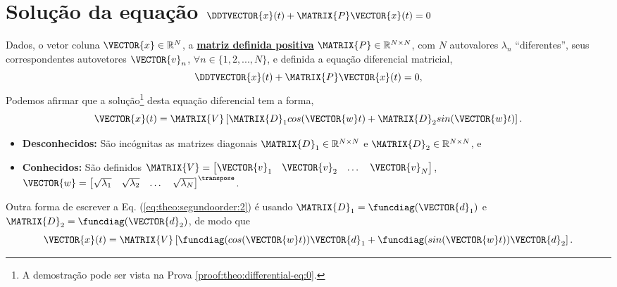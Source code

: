 \section{ Solução da equação $\DDTVECTOR{x}(t) + \MATRIX{P} \VECTOR{x}(t)=0$ }

\begin{theorem}[Equação 
$\DDTVECTOR{x}(t) + \MATRIX{P} \VECTOR{x}(t)=0$ com matriz $\MATRIX{P}$ definida positiva:]
\label{theo:differential-eq:0}
Dados, o vetor coluna $\VECTOR{x} \in \mathbb{R}^N$, 
a \hyperref[def:positivematrix0]{\textbf{matriz definida positiva}} $\MATRIX{P} \in \mathbb{R}^{N\times N}$,
com $N$ autovalores $\lambda_n$ ``diferentes'', seus correspondentes autovetores $\VECTOR{v}_n$,
$\forall n \in \{1, 2, ..., N\}$, 
e definida a equação diferencial matricial,
\begin{equation}\label{eq:theo:segundoorder:1}
\DDTVECTOR{x}(t) + \MATRIX{P} \VECTOR{x}(t)=0,
\end{equation}
Podemos afirmar que a solução\footnote{A
demostração pode ser vista na Prova \ref{proof:theo:differential-eq:0}.} desta equação diferencial tem  a forma,
\begin{equation}\label{eq:theo:segundoorder:2}
 \VECTOR{x}(t)= \MATRIX{V}\left[\MATRIX{D}_1 cos(\VECTOR{w}t) + \MATRIX{D}_2 sin(\VECTOR{w}t) \right].
\end{equation}
\begin{itemize}
\item \textbf{Desconhecidos:} São incógnitas as matrizes diagonais $\MATRIX{D}_1 \in \mathbb{R}^{N \times N}$ e $\MATRIX{D}_2  \in \mathbb{R}^{N \times N}$, e
\item  \textbf{Conhecidos:} São definidos $\MATRIX{V}=
\begin{bmatrix}
\VECTOR{v}_1 & \VECTOR{v}_2 & \dots & \VECTOR{v}_N
\end{bmatrix}$, 
$\VECTOR{w}=
\begin{bmatrix}
\sqrt{\lambda_1} & \sqrt{\lambda_2} & \dots & \sqrt{\lambda_N}
\end{bmatrix}^{\transpose}$.
\end{itemize}
\end{theorem}

\begin{corollary}
\label{coro:differential-eq:0}
Outra forma de escrever a Eq. (\ref{eq:theo:segundoorder:2}) é usando $\MATRIX{D}_1=\funcdiag(\VECTOR{d}_1)$ e $\MATRIX{D}_2=\funcdiag(\VECTOR{d}_2)$, de modo que
\begin{equation}\label{eq:coro:segundoorder:1}
 \VECTOR{x}(t)= \MATRIX{V}\left[ \funcdiag(cos(\VECTOR{w}t))\VECTOR{d}_1 +  \funcdiag(sin(\VECTOR{w}t)) \VECTOR{d}_2 \right].
\end{equation}
\end{corollary}

